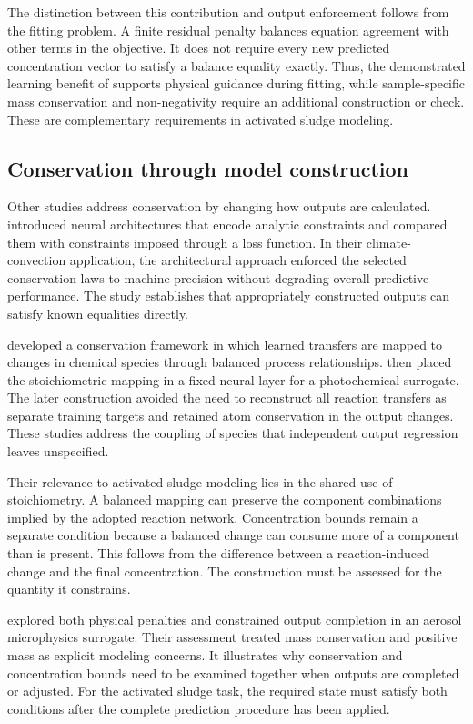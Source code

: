 The distinction between this contribution and output enforcement follows from the fitting problem. A finite residual penalty balances equation agreement with other terms in the objective. It does not require every new predicted concentration vector to satisfy a balance equality exactly. Thus, the demonstrated learning benefit of \citet{Li2024} supports physical guidance during fitting, while sample-specific mass conservation and non-negativity require an additional construction or check. These are complementary requirements in activated sludge modeling.

\subsection{Conservation through model construction}

Other studies address conservation by changing how outputs are calculated. \citet{Beucler2021} introduced neural architectures that encode analytic constraints and compared them with constraints imposed through a loss function. In their climate-convection application, the architectural approach enforced the selected conservation laws to machine precision without degrading overall predictive performance. The study establishes that appropriately constructed outputs can satisfy known equalities directly.

\citet{SturmWexler2020} developed a conservation framework in which learned transfers are mapped to changes in chemical species through balanced process relationships. \citet{SturmWexler2022} then placed the stoichiometric mapping in a fixed neural layer for a photochemical surrogate. The later construction avoided the need to reconstruct all reaction transfers as separate training targets and retained atom conservation in the output changes. These studies address the coupling of species that independent output regression leaves unspecified.

Their relevance to activated sludge modeling lies in the shared use of stoichiometry. A balanced mapping can preserve the component combinations implied by the adopted reaction network. Concentration bounds remain a separate condition because a balanced change can consume more of a component than is present. This follows from the difference between a reaction-induced change and the final concentration. The construction must be assessed for the quantity it constrains.

\citet{Harder2022} explored both physical penalties and constrained output completion in an aerosol microphysics surrogate. Their assessment treated mass conservation and positive mass as explicit modeling concerns. It illustrates why conservation and concentration bounds need to be examined together when outputs are completed or adjusted. For the activated sludge task, the required state must satisfy both conditions after the complete prediction procedure has been applied.

